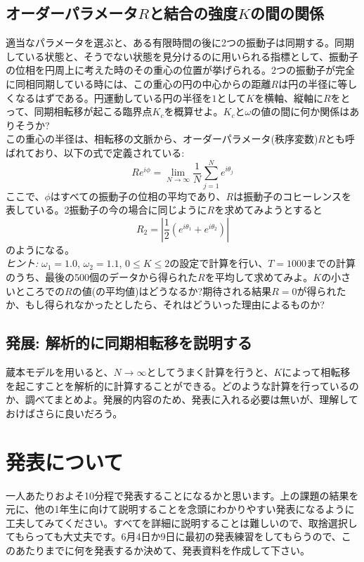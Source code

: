 \documentclass{jsarticle}
\begin{document}
\subsection{オーダーパラメータ$R$と結合の強度$K$の間の関係}
    適当なパラメータを選ぶと、ある有限時間の後に2つの振動子は同期する。同期している状態と、そうでない状態を見分けるのに用いられる指標として、振動子の位相を円周上に考えた時のその重心の位置が挙げられる。2つの振動子が完全に同相同期している時には、この重心の円の中心からの距離$R$は円の半径に等しくなるはずである。円運動している円の半径を$1$として$K$を横軸、縦軸に$R$をとって、同期相転移が起こる臨界点$K_{c}$を概算せよ。$K_{c}$と$\omega$の値の間に何か関係はありそうか?\\
    この重心の半径は、相転移の文脈から、オーダーパラメータ(秩序変数)$R$とも呼ばれており、以下の式で定義されている:
    $$Re^{i\phi} = \lim_{N\rightarrow \infty}\frac{1}{N}\sum_{j=1}^{N} e^{i\theta_{j}}$$
    ここで、$\phi$はすべての振動子の位相の平均であり、$R$は振動子のコヒーレンスを表している。2振動子の今の場合に同じように$R$を求めてみようとすると
    $$R_{2} = \left| \frac{1}{2} (e^{i\theta_{1}} + e^{i\theta_{2}}) \right|$$
    のようになる。\\
    \emph{ヒント:} $\omega_{1} = 1.0$, $\omega_{2} = 1.1$, $0\le K \le 2$の設定で計算を行い、$T=1000$までの計算のうち、最後の500個のデータから得られた$R$を平均して求めてみよ。$K$の小さいところでの$R$の値(の平均値)はどうなるか?期待される結果$R=0$が得られたか、もし得られなかったとしたら、それはどういった理由によるものか?

\subsection{発展: 解析的に同期相転移を説明する}
蔵本モデルを用いると、$N\rightarrow \infty$としてうまく計算を行うと、$K$によって相転移を起こすことを解析的に計算することができる。どのような計算を行っているのか、調べてまとめよ。発展的内容のため、発表に入れる必要は無いが、理解しておけばさらに良いだろう。

\section{発表について}

一人あたりおよそ10分程で発表することになるかと思います。上の課題の結果を元に、他の1年生に向けて説明することを念頭にわかりやすい発表になるように工夫してみてください。すべてを詳細に説明することは難しいので、取捨選択してもらっても大丈夫です。6月4日か9日に最初の発表練習をしてもらうので、このあたりまでに何を発表するか決めて、発表資料を作成して下さい。
\end{document}

